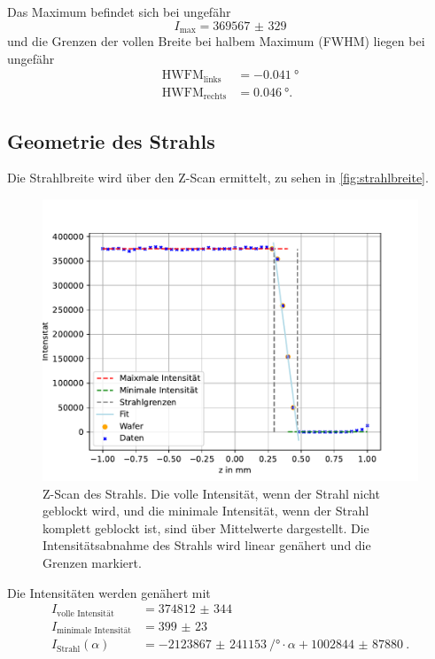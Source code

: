 Das Maximum befindet sich bei ungefähr
\begin{equation*}
    I_\text{max} = \num{369567(329)}
\end{equation*}
und die Grenzen der vollen Breite bei halbem Maximum (FWHM) liegen bei ungefähr
\begin{align*}
   \text{HWFM}_\text{links} &= \qty{-0.041}{\degree} \\
   \text{HWFM}_\text{rechts} &= \qty{0.046}{\degree}.
\end{align*}

\subsection{Geometrie des Strahls}

Die Strahlbreite wird über den Z-Scan ermittelt, zu sehen in \autoref{fig:strahlbreite}.

\begin{figure}[H]
    \centering
    \includegraphics[width=\textwidth]{plots/zscan.pdf}
    \caption{Z-Scan des Strahls. Die volle Intensität, wenn der Strahl nicht geblockt wird, und die minimale Intensität, wenn der Strahl komplett geblockt ist, sind über Mittelwerte dargestellt.
    Die Intensitätsabnahme des Strahls wird linear genähert und die Grenzen markiert.}
    \label{fig:strahlbreite}
\end{figure}

Die Intensitäten werden genähert mit
\begin{align*}
    I_\text{volle Intensität} &= \qty{374812(344)}{} \\
    I_\text{minimale Intensität} &= \qty{399(23)}{} \\
    I_\text{Strahl}(\alpha) &= \qty{-2123867(241153)}{\per\degree} \cdot \alpha + \qty{1002844(87880)}{}.
\end{align*}

